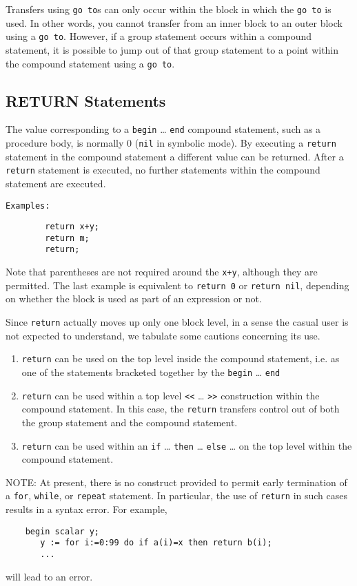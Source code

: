Transfers using \texttt{go to}s can only occur within the block in which the
\texttt{go to} is used.  In other words, you cannot transfer from an inner
block to an outer block using a \texttt{go to}.  However, if a group statement
occurs within a compound statement, it is possible to jump out of that group
statement to a point within the compound statement using a \texttt{go to}.

\subsection{RETURN Statements}
\hypertarget{command:RETURN}{}

The value corresponding to a \texttt{begin} \ldots{} \texttt{end} compound
statement,
 such as a procedure body, is normally 0
(\texttt{nil} in symbolic mode).  By executing a \texttt{return}
statement in the compound statement a different value can be returned.
After a \texttt{return} statement is executed, no further statements within
the compound statement are executed.

\texttt{Examples:}
\begin{verbatim}
        return x+y;
        return m;
        return;
\end{verbatim}
Note that parentheses are not required around the \texttt{x+y}, although they
are permitted.  The last example is equivalent to \texttt{return 0} or
\texttt{return nil}, depending on whether the block is used as part of an
expression or not.

Since \texttt{return} actually moves up only one
block level, in a sense the casual user is not expected to
understand, we tabulate some cautions concerning its use.
\begin{enumerate}
\item \texttt{return} can be used on the top level inside the compound
statement, i.e. as one of the statements bracketed together by the
\texttt{begin} \ldots{} \texttt{end}

\item \texttt{return} can be used within a top level \texttt{<}\texttt{<}
  \ldots{} \texttt{>}\texttt{>} construction within the compound statement. In
  this case, the \texttt{return} transfers control out of both the
  group statement and the compound statement.

\item \texttt{return} can be used within an \texttt{if} \ldots{}
  \texttt{then} \ldots{} \texttt{else} \ldots{} on the top level within
  the compound statement.
\end{enumerate}
NOTE:  At present, there is no construct provided to permit early
termination of a \texttt{for}, \texttt{while},
or \texttt{repeat} statement.  In particular, the use of
\texttt{return} in such cases results in a syntax error.  For example,
\begin{verbatim}
    begin scalar y;
       y := for i:=0:99 do if a(i)=x then return b(i);
       ...
\end{verbatim}
will lead to an error.
